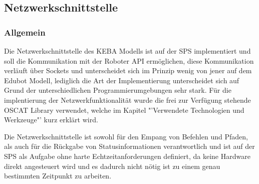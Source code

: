 \subsection{Netzwerkschnittstelle}
\subsubsection{Allgemein}
Die Netzwerkschnittstelle des KEBA Modells ist auf der SPS implementiert und soll die Kommunikation mit der Roboter API ermöglichen, diese Kommunikation verläuft über Sockets und unterscheidet sich im Prinzip wenig von jener auf dem Edubot Modell, lediglich die Art der Implementierung unterscheidet sich auf Grund der unterschiedlichen Programmierumgebungen sehr stark. Für die implentierung der Netzwerkfunktionalität wurde die frei zur Verfügung stehende OSCAT Library verwendet, welche im Kapitel "'Verwendete Technologien und Werkzeuge"' kurz erklärt wird. 

Die Netzwerkschnittstelle ist sowohl für den Empang von Befehlen und Pfaden, als auch für die Rückgabe von Statusinformationen verantwortlich und ist auf der SPS als Aufgabe ohne harte Echtzeitanforderungen definiert, da keine Hardware direkt angesteuert wird und es dadurch nicht nötig ist zu einem genau bestimmten Zeitpunkt zu arbeiten.


